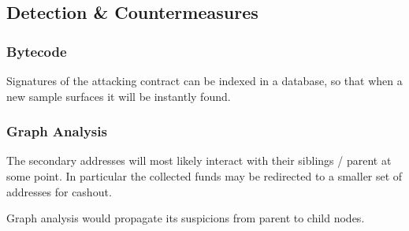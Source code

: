 \subsection{Detection \& Countermeasures}

\subsubsection{Bytecode}

Signatures of the attacking contract can be indexed in a database, so that when a new sample surfaces it will be instantly found.

\subsubsection{Graph Analysis}

The secondary addresses will most likely interact with their siblings / parent at some point.
In particular the collected funds may be redirected to a smaller set of addresses for cashout.

Graph analysis would propagate its suspicions from parent to child nodes.
